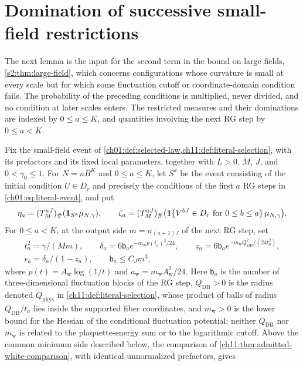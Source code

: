 \section{Domination of successive small-field restrictions}\label{ch19:sec:prefix}

The next lemma is the input for the second term in the bound on large fields, \cref{s2:thm:large-field}, which concerns configurations whose curvature is small at every scale but for which some fluctuation cutoff or coordinate-domain condition fails. The probability of the preceding conditions is multiplied, never divided, and no condition at later scales enters. The restricted measures and their dominations are indexed by $0\le a\le K$, and quantities involving the next RG step by $0\le a<K$.

\begin{lemma}\label{ch19:lem:original-prefix-onsets}
Fix the small-field event of \cref{ch01:def:selected-law,ch11:def:literal-selection}, with its prefactors and its fixed local parameters, together with $L>0$, $M$, $J$, and $0<\gamma_0\le1$. For $N=uB^K$ and $0\le a\le K$, let $S^a$ be the event consisting of the initial condition $U\in D_r$ and precisely the conditions of the first $a$ RG steps in \eqref{ch01:eq:literal-event}, and put
\[
 \eta_a=(T_M^{aJ})_\#(\mathbf 1_{S^a}\mu_{N,\gamma}),\qquad
 \zeta_a=(T_M^{aJ})_\#\bigl(\mathbf 1\{V^{bJ}\in D_r\text{ for }0\le b\le a\}\,\mu_{N,\gamma}\bigr).
\]
For $0\le a<K$, at the output side $m=n_{(a+1)J}$ of the next RG step, set
\[
 \begin{gathered}
 t_a^2=\gamma/(Mm),\qquad
 \delta_a=6\mathsf b_ae^{-m_{\mathrm w}p(t_a)^2/24},\qquad
 z_a=6\mathsf b_ae^{-m_{\mathrm w}Q_{\mathrm{DB}}^2/(24t_a^2)},\\
 \epsilon_a=\delta_a/(1-z_a),\qquad\mathsf b_a\le C_Jm^3,
 \end{gathered}
\]
where $p(t)=A_{\mathrm w}\log(1/t)$ and $a_{\mathrm w}=m_{\mathrm w}A_{\mathrm w}^2/24$. Here $\mathsf b_a$ is the number of three-dimensional fluctuation blocks of the RG step, $Q_{\mathrm{DB}}>0$ is the radius denoted $Q_{\mathrm{phys}}$ in \cref{ch11:def:literal-selection}, whose product of balls of radius $Q_{\mathrm{DB}}/t_a$ lies inside the supported fiber coordinates, and $m_{\mathrm w}>0$ is the lower bound for the Hessian of the conditional fluctuation potential; neither $Q_{\mathrm{DB}}$ nor $m_{\mathrm w}$ is related to the plaquette-energy sum or to the logarithmic cutoff. Above the common minimum side described below, the comparison of \cref{ch11:thm:admitted-white-comparison}, with identical unnormalized prefactors, gives

\end{lemma}
